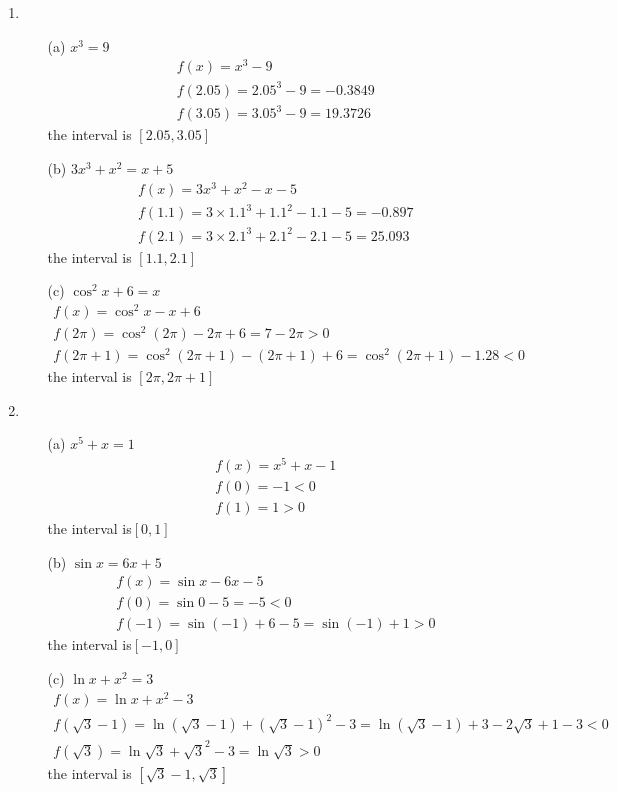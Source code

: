 \documentclass[UTF8]{ctexart}
\begin{document}
\begin{enumerate}
\item \begin{itemize}
\item[(a)] $x^3 = 9$
\begin{gather*}
f(x) = x^3 - 9 \\
f(2.05) = 2.05^3 - 9 = -0.3849 \\
f(3.05) = 3.05^3 - 9 = 19.3726
\end{gather*}
the interval is $[2.05, 3.05]$

\item[(b)] $3x^3 + x^2 = x + 5$
\begin{gather*}
f(x) = 3x^3 + x^2 - x - 5 \\
f(1.1) = 3 \times 1.1^3 + 1.1^2 - 1.1 - 5 = -0.897 \\
f(2.1) = 3 \times 2.1^3 + 2.1^2 - 2.1 - 5 = 25.093
\end{gather*}
the interval is $[1.1, 2.1]$

\item[(c)] $\cos^2 x + 6 = x$
\begin{gather*}
f(x) = \cos^2 x - x + 6 \\
f(2\pi) = \cos^2 (2\pi) - 2\pi + 6 = 7 - 2\pi > 0 \\
f(2\pi+1) = \cos^2(2\pi+1) - (2\pi+1) + 6 = \cos^2(2\pi+1) - 1.28 < 0
\end{gather*}
the interval is $[2\pi, 2\pi+1]$

\end{itemize}
\item \begin{itemize}
\item[(a)] $x^5 + x = 1$
\begin{gather*}
f(x) = x^5 + x - 1 \\
f(0) = -1 < 0 \\
f(1) = 1 > 0
\end{gather*}
the interval is$[0, 1]$

\item[(b)] $\sin x = 6x + 5$
\begin{gather*}
f(x) = \sin x - 6x - 5 \\
f(0) = \sin 0 - 5 = -5 < 0 \\
f(-1) = \sin (-1) + 6 - 5 = \sin (-1) + 1 > 0
\end{gather*}
the interval is$[-1, 0]$

\item[(c)] $\ln x + x^2 = 3$ 
\begin{gather*}
f(x) = \ln x + x^2 - 3 \\
f(\sqrt{3} - 1) = \ln (\sqrt{3} - 1) + (\sqrt{3} - 1)^2 - 3 = \ln (\sqrt{3} - 1) + 3 - 2\sqrt{3} + 1 - 3 < 0\\
f(\sqrt{3}) = \ln \sqrt{3} + {\sqrt{3}}^2 - 3 = \ln \sqrt{3} > 0
\end{gather*}
the interval is $[\sqrt{3} - 1, \sqrt{3}]$


\end{itemize}
\end{enumerate}
\end{document}
